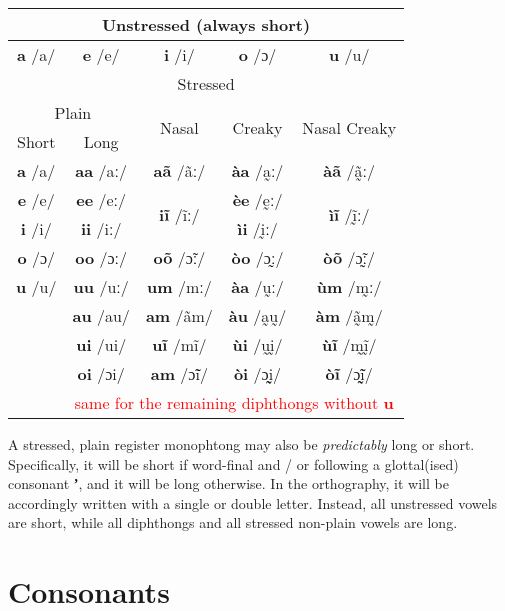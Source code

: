 \documentclass[11pt]{book}
\newcommand{\qcn}[1]{\textbf{#1}}
\newcommand{\cmnt}[1]{\textcolor{red}{#1}}
\begin{document}
\begin{center}
\renewcommand{\arraystretch}{1.5}
\begin{tabular}{|c|c|c|c|c|}
\hline
\multicolumn{5}{|c|}{Unstressed (always short)}\\ \hline 
\qcn{a} /a/ & \qcn{e} /e/&\qcn{i} /i/&\qcn{o} /ɔ/&\qcn{u} /u/ \\ \hline \hline
\multicolumn{5}{|c|}{Stressed}\\ \hline
\multicolumn{2}{|c|}{Plain} & \multirow{2}{*}{Nasal} & \multirow{2}{*}{Creaky} & \multirow{2}{*}{Nasal Creaky}\\ \cline{1-2}
Short & Long &&& \\ \hline
\qcn{a} /a/&\qcn{aa} /aː/ & \qcn{aã} /ãː/ & \qcn{àa} /a̰ː/ & \qcn{àã} /ã̰ː/ \\ \hline
\qcn{e} /e/&\qcn{ee} /eː/ & \multirow{2}{*}{\qcn{iĩ} /ĩː/} & \qcn{èe} /ḛː/ & \multirow{2}{*}{\qcn{ìĩ} /ḭ̃ː/}  \\ \cline{1-2} \cline{4-4}
\qcn{i} /i/&\qcn{ii} /iː/ &  & \qcn{ìi} /ḭː/ & \\ \hline
\qcn{o} /ɔ/&\qcn{oo} /ɔː/ & \qcn{oõ} /ɔ̃ː/ & \qcn{òo} /ɔ̰ː/ & \qcn{òõ} /ɔ̰̃ː/ \\ \hline
\qcn{u} /u/&\qcn{uu} /uː/ & \qcn{um} /mː/ & \qcn{àa} /ṵː/ & \qcn{ùm} /m̰ː/ \\ \hline
&\qcn{au} /au/ & \qcn{am} /ãm/ & \qcn{àu} /a̰ṵ/ & \qcn{àm} /ã̰m̰/ \\ \hline
&\qcn{ui} /ui/ & \qcn{uĩ} /mĩ/ & \qcn{ùi} /ṵḭ/ & \qcn{ùĩ} /m̰ḭ̃/ \\ \hline
&\qcn{oi} /ɔi/ & \qcn{am} /ɔ̃ĩ/ & \qcn{òi} /ɔ̰ḭ/ & \qcn{òĩ} /ɔ̰̃ḭ̃/ \\ \hline
&\multicolumn{4}{c|}{\cmnt{same for the remaining diphthongs without \qcn{u}}} \\ \hline 
\end{tabular}
\end{center}

A stressed, plain register monophtong may also be \emph{predictably} long or short. Specifically, it will be short if word-final and / or following a glottal(ised) consonant \qcn{ʼ}, and it will be long otherwise. In the orthography, it will be accordingly written with a single or double letter. Instead, all unstressed vowels are short, while all diphthongs and all stressed non-plain vowels are long.


\section{Consonants}
\end{document}
